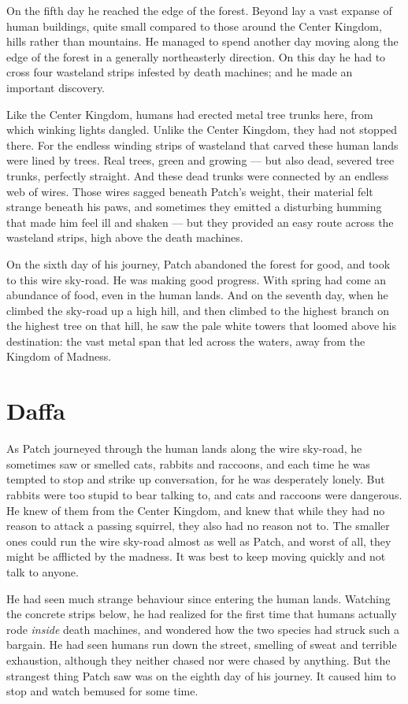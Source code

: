 \documentclass[12pt]{book}
\begin{document}
On the fifth day he reached the edge of the forest. Beyond lay a vast expanse of human buildings, quite small compared to those around the Center Kingdom, hills rather than mountains. He managed to spend another day moving along the edge of the forest in a generally northeasterly direction. On this day he had to cross four wasteland strips infested by death machines; and he made an important discovery.

Like the Center Kingdom, humans had erected metal tree trunks here, from which winking lights dangled. Unlike the Center Kingdom, they had not stopped there. For the endless winding strips of wasteland that carved these human lands were lined by trees. Real trees, green and growing ---
but also dead, severed tree trunks, perfectly straight. And these dead trunks were connected by an endless web of wires. Those wires sagged beneath Patch's weight, their material felt strange beneath his paws, and sometimes they emitted a disturbing humming that made him feel ill and shaken ---
but they provided an easy route across the wasteland strips, high above the death machines.

On the sixth day of his journey, Patch abandoned the forest for good, and took to this wire sky-road. He was making good progress. With spring had come an abundance of food, even in the human lands. And on the seventh day, when he climbed the sky-road up a high hill, and then climbed to the highest branch on the highest tree on that hill, he saw the pale white towers that loomed above his destination: the vast metal span that led across the waters, away from the Kingdom of Madness.


\section{Daffa}

As Patch journeyed through the human lands along the wire sky-road, he sometimes saw or smelled cats, rabbits and raccoons, and each time he was tempted to stop and strike up conversation, for he was desperately lonely. But rabbits were too stupid to bear talking to, and cats and raccoons were dangerous. He knew of them from the Center Kingdom, and knew that while they had no reason to attack a passing squirrel, they also had no reason not to. The smaller ones could run the wire sky-road almost as well as Patch, and worst of all, they might be afflicted by the madness. It was best to keep moving quickly and not talk to anyone.

He had seen much strange behaviour since entering the human lands. Watching the concrete strips below, he had realized for the first time that humans actually rode {\it inside} death machines, and wondered how the two species had struck such a bargain. He had seen humans run down the street, smelling of sweat and terrible exhaustion, although they neither chased nor were chased by anything. But the strangest thing Patch saw was on the eighth day of his journey. It caused him to stop and watch bemused for some time.
\end{document}
